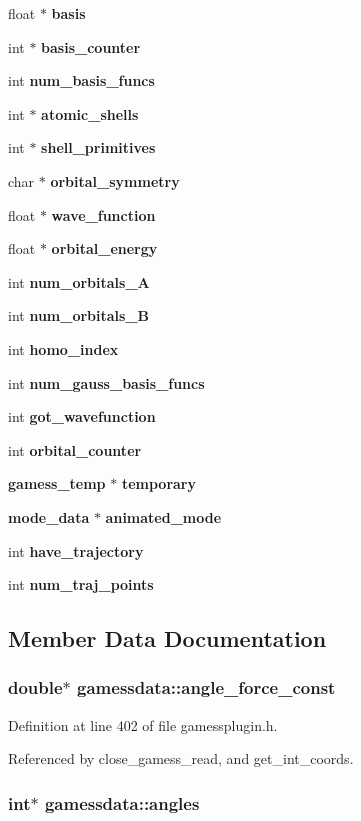 \begin{CompactItemize}
float $\ast$ {\bf basis}
\item 
int $\ast$ {\bf basis\_\-counter}
\item 
int {\bf num\_\-basis\_\-funcs}
\item 
int $\ast$ {\bf atomic\_\-shells}
\item 
int $\ast$ {\bf shell\_\-primitives}
\item 
char $\ast$ {\bf orbital\_\-symmetry}
\item 
float $\ast$ {\bf wave\_\-function}
\item 
float $\ast$ {\bf orbital\_\-energy}
\item 
int {\bf num\_\-orbitals\_\-A}
\item 
int {\bf num\_\-orbitals\_\-B}
\item 
int {\bf homo\_\-index}
\item 
int {\bf num\_\-gauss\_\-basis\_\-funcs}
\item 
int {\bf got\_\-wavefunction}
\item 
int {\bf orbital\_\-counter}
\item 
{\bf gamess\_\-temp} $\ast$ {\bf temporary}
\item 
{\bf mode\_\-data} $\ast$ {\bf animated\_\-mode}
\item 
int {\bf have\_\-trajectory}
\item 
int {\bf num\_\-traj\_\-points}
\end{CompactItemize}


\subsection{Member Data Documentation}
\subsubsection{\setlength{\rightskip}{0pt plus 5cm}double$\ast$ gamessdata::angle\_\-force\_\-const}\label{structgamessdata_m50}




Definition at line 402 of file gamessplugin.h.

Referenced by close\_\-gamess\_\-read, and get\_\-int\_\-coords.
\subsubsection{\setlength{\rightskip}{0pt plus 5cm}int$\ast$ gamessdata::angles}\label{structgamessdata_m45}




